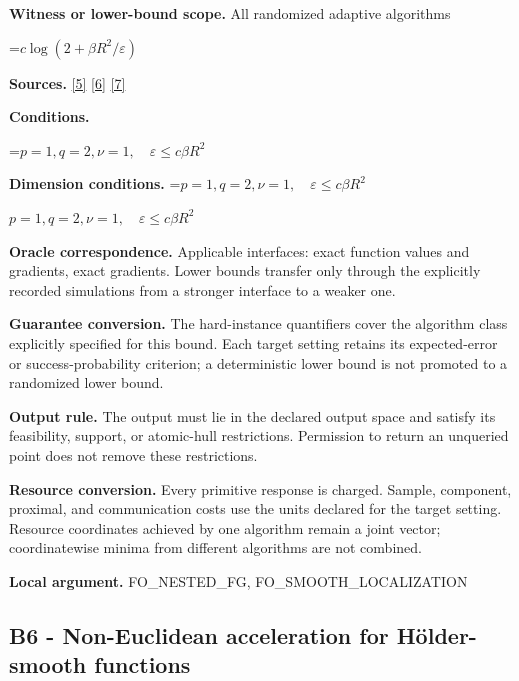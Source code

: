 \documentclass[10pt,a4paper]{article}
\newcommand{\AtlasMath}[1]{\par\begingroup\centering\setbox0=\hbox{$\displaystyle #1$}\ifdim\wd0>1.4\linewidth\typeout{ATLAS WIDE FORMULA: \the\wd0}\fi\ifdim\wd0>\linewidth\resizebox{\linewidth}{!}{\box0}\else\box0\fi\par\endgroup}
\newcommand{\AtlasInlineMath}[1]{\begingroup\setbox0=\hbox{$#1$}\ifdim\wd0>.4\linewidth\endgroup\AtlasMath{#1}\else\endgroup$#1$\fi}
\begin{document}
\textbf{Witness or lower-bound scope.} All randomized adaptive algorithms



\AtlasMath{c\log(2+\beta R^2/\varepsilon)}


\textbf{Sources.} \href{https://arxiv.org/pdf/2101.09740v2}{[5]} \href{https://arxiv.org/pdf/2609.33360v2}{[6]} \href{https://arxiv.org/pdf/2609.10874}{[7]}



\textbf{Conditions.}
\AtlasMath{p=1,q=2,\nu=1,\quad\varepsilon\le c\beta R^2}




\textbf{Dimension conditions.} \AtlasInlineMath{p=1,q=2,\nu=1,\quad\varepsilon\le c\beta R^2}



\textbf{Oracle correspondence.} Applicable interfaces: exact function values and gradients, exact gradients. Lower bounds transfer only through the explicitly recorded simulations from a stronger interface to a weaker one.



\textbf{Guarantee conversion.} The hard-instance quantifiers cover the algorithm class explicitly specified for this bound. Each target setting retains its expected-error or success-probability criterion; a deterministic lower bound is not promoted to a randomized lower bound.



\textbf{Output rule.} The output must lie in the declared output space and satisfy its feasibility, support, or atomic-hull restrictions. Permission to return an unqueried point does not remove these restrictions.



\textbf{Resource conversion.} Every primitive response is charged. Sample, component, proximal, and communication costs use the units declared for the target setting. Resource coordinates achieved by one algorithm remain a joint vector; coordinatewise minima from different algorithms are not combined.



\textbf{Local argument.} FO\_NESTED\_FG, FO\_SMOOTH\_LOCALIZATION



\subsection{B6 - Non-Euclidean acceleration for Hölder-smooth functions}
\end{document}
